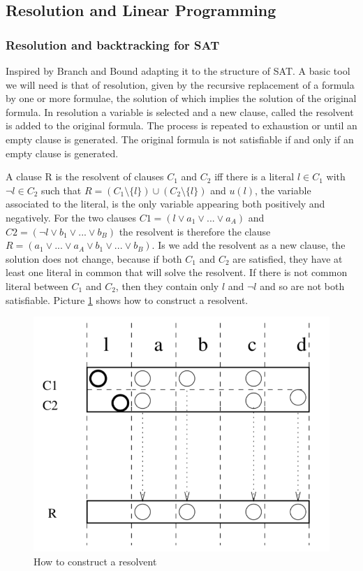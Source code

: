 \documentclass[10pt]{article}
\begin{document}
\subsection{Resolution and Linear Programming}
\subsubsection{Resolution and backtracking for SAT}
Inspired by Branch and Bound adapting it to the structure of SAT. A basic tool we will need is that of resolution, given by the recursive replacement of a formula by one or more formulae, the solution of which implies the solution of the original formula. In resolution a variable is selected and a new clause, called the resolvent is added to the original formula. The process is repeated to exhaustion or until an empty clause is generated. The original formula is not satisfiable if and only if an empty clause is generated. 

A clause R is the resolvent of clauses $C_1$ and $C_2$ iff there is a literal $l \in C_1$ with $\lnot l \in C_2$ such that $R = (C_1 \setminus \{l\}) \cup (C_2 \setminus \{l\})$ and $u(l)$, the variable associated to the literal, is the only variable appearing both positively and negatively. For the two clauses $C1 = (l \lor a_1 \lor ... \lor a_A)$ and $C2 = (\lnot l \lor b_1 \lor ... \lor b_B)$ the resolvent is therefore the clause $R = (a_1 \lor ... \lor a_A \lor b_1 \lor ... \lor b_B )$. Is we add the resolvent as a new clause, the solution does not change, because if both $C_1$ and $C_2$ are satisfied, they have at least one literal in common that will solve the resolvent. If there is not common literal between $C_1$ and $C_2$, then they contain only $l$ and $\lnot l$ and so are not both satisfiable. Picture \ref{fig:resolvent} shows how to construct a resolvent.

\begin{figure}[H]
\includegraphics[scale=0.5]{resolvent}
\caption{How to construct a resolvent}
\centering
\label{fig:resolvent}
\end{figure}
\end{document}
